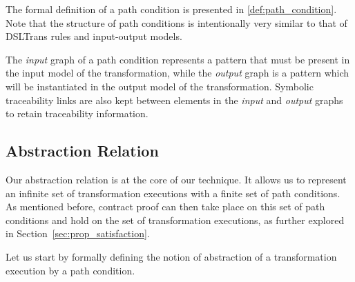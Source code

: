%


The formal definition of a path condition is presented in \cref{def:path_condition}. Note that the structure of path conditions is intentionally very similar to that of DSLTrans rules and input-output models.

The \textit{input} graph of a path condition represents a pattern that must be present in the input model of the transformation, while the \textit{output} graph is a pattern which will be instantiated in the output model of the transformation. Symbolic traceability links are also kept between elements in the \textit{input} and \textit{output} graphs to retain traceability information.

\subsection{Abstraction Relation}
\label{subsec:abstraction_relation}

Our abstraction relation is at the core of our technique. It allows us to represent an infinite set of transformation executions with a finite set of path conditions. As mentioned before, contract proof can then take place on this set of path conditions and hold on the set of transformation executions, as further explored in Section~\ref{sec:prop_satisfaction}.

Let us start by formally defining the notion of abstraction of a transformation
execution by a path condition.


